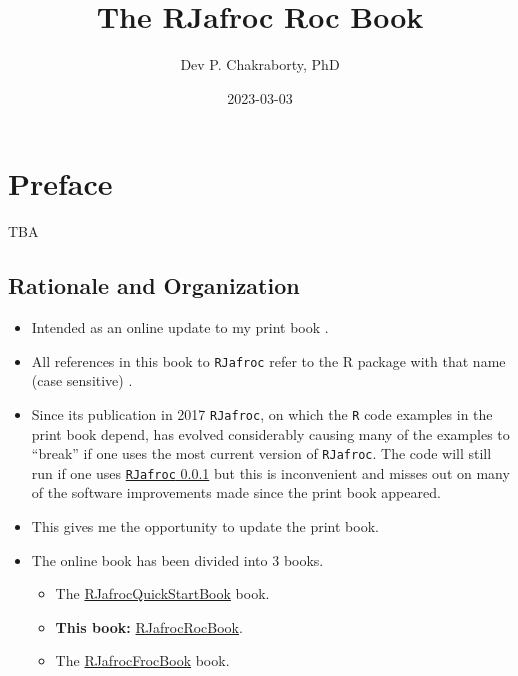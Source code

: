 \documentclass[
]{book}
\title{The RJafroc Roc Book}
\author{Dev P. Chakraborty, PhD}
\date{2023-03-03}
\providecommand{\tightlist}{%
  \setlength{\itemsep}{0pt}\setlength{\parskip}{0pt}}
\begin{document}
\maketitle

{
\setcounter{tocdepth}{1}
\tableofcontents
}
\hypertarget{preface}{%
\chapter*{Preface}\label{preface}}

TBA

\hypertarget{rationale-and-organization}{%
\section{Rationale and Organization}\label{rationale-and-organization}}

\begin{itemize}
\tightlist
\item
  Intended as an online update to my print book \citep{chakraborty2017observer}.
\item
  All references in this book to \texttt{RJafroc} refer to the R package with that name (case sensitive) \citep{R-RJafroc}.
\item
  Since its publication in 2017 \texttt{RJafroc}, on which the \texttt{R} code examples in the print book depend, has evolved considerably causing many of the examples to ``break'' if one uses the most current version of \texttt{RJafroc}. The code will still run if one uses \href{https://cran.r-project.org/src/contrib/Archive/RJafroc/}{\texttt{RJafroc} 0.0.1} but this is inconvenient and misses out on many of the software improvements made since the print book appeared.
\item
  This gives me the opportunity to update the print book.
\item
  The online book has been divided into 3 books.

  \begin{itemize}
  \tightlist
  \item
    The \href{https://dpc10ster.github.io/RJafrocQuickStart/}{RJafrocQuickStartBook} book.
  \item
    \textbf{This book:} \href{https://dpc10ster.github.io/RJafrocRocBook/}{RJafrocRocBook}.
  \item
    The \href{https://dpc10ster.github.io/RJafrocFrocBook/}{RJafrocFrocBook} book.
  \end{itemize}
\end{itemize}
\end{document}
